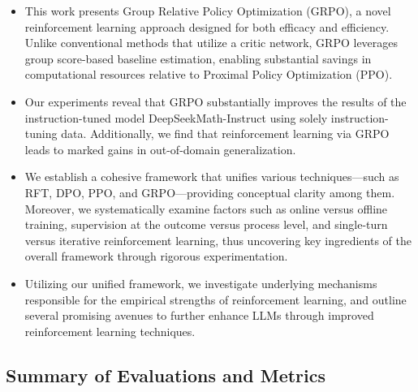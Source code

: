\begin{itemize}[topsep=0pt]
    \item This work presents Group Relative Policy Optimization (GRPO), a novel reinforcement learning approach designed for both efficacy and efficiency. Unlike conventional methods that utilize a critic network, GRPO leverages group score-based baseline estimation, enabling substantial savings in computational resources relative to Proximal Policy Optimization (PPO).
    \item Our experiments reveal that GRPO substantially improves the results of the instruction-tuned model DeepSeekMath-Instruct using solely instruction-tuning data. Additionally, we find that reinforcement learning via GRPO leads to marked gains in out-of-domain generalization.
    \item We establish a cohesive framework that unifies various techniques—such as RFT, DPO, PPO, and GRPO—providing conceptual clarity among them. Moreover, we systematically examine factors such as online versus offline training, supervision at the outcome versus process level, and single-turn versus iterative reinforcement learning, thus uncovering key ingredients of the overall framework through rigorous experimentation.
    \item Utilizing our unified framework, we investigate underlying mechanisms responsible for the empirical strengths of reinforcement learning, and outline several promising avenues to further enhance LLMs through improved reinforcement learning techniques.
\end{itemize}

\subsection{Summary of Evaluations and Metrics}

